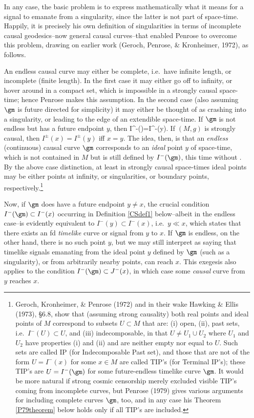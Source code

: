 \documentclass[11pt,a4paper]{article}
\begin{document}
 In any case, the basic problem is to express mathematically what it means for a signal to emanate from a singularity, since the latter is not part of space-time. Happily, it is precisely his own definition of singularities in terms of incomplete causal 
 geodesics--now general causal curves--that enabled Penrose to overcome this problem, drawing on earlier work (Geroch, Penrose, \& Kronheimer, 1972), as follows.  
 
 An endless causal curve may either be complete, i.e.\ have infinite  length, or incomplete (finite length). In the first case it may either go off to infinity, or hover around in a compact set, which  is impossible in a strongly causal space-time; hence Penrose makes this assumption.  In the second case (also assuming $\gm$ is future directed for simplicity) it may either be thought of as  crashing into a singularity, or leading to the edge of an extendible space-time. If $\gm$ is not endless but has a future endpoint $y$, then
 \beq
 I^-(\gm)=I^-(y). \label{IgmIy}
 \eeq
  If $(M,g)$ is strongly causal, then 
$I^{\pm}(x)=I^{\pm}(y)$ iff $x=y$. The idea, then, is that an \emph{endless} (continuous) causal curve $\gm$ corresponds to an \emph{ideal} point 
 $y$ of space-time, which is not contained in $M$ but is still defined by $I^-(\gm)$, this time without .
 By the above case distinction, at least in strongly causal space-times ideal points may be either points at infinity, or singularities, or  boundary points, respectively.\footnote{\label{GKP72}    Geroch, Kronheimer, \&  Penrose (1972) and in their wake Hawking \& Ellis (1973), \S 6.8, show that
 (assuming strong causality) both real points and ideal points of $M$ correspond to subsets  $U\subset M$ that are:
 (i) open, (ii), past sets, i.e.\ $I^-(U)\subset U$, and (iii) indecomposable, in that $U\neq U_1\cup U_2$ where $U_1$ and $U_2$ have properties (i) and (ii) and are neither empty nor equal to $U$. Such sets are called IP (for Indecomposable Past set), and those that are not of the form $U=I^-(x)$ for some $x\in M$ are called TIP's (for Terminal IP's);  these TIP's are $U=I^-(\gm)$ for some  future-endless timelike curve $\gm$. It would  be more natural if strong cosmic censorship merely excluded visible TIP's coming from incomplete curves, but Penrose (1979) gives various arguments for including complete curves $\gm$, too, and in any case his Theorem 
 \ref{P79theorem} below holds only if all TIP's are included.  }
 
\noindent   Now, if $\gm$ does have a future endpoint $y\neq x$, the crucial condition 
$I^-(\gm)\subset I^-(x)$
  occurring in Definition \ref{CSdef1} below--albeit in the endless case--is evidently equivalent to $I^-(y)\subset I^-(x)$, i.e.\ $y\ll x$, which  states that there exists an fd \emph{timelike} curve or signal from $y$ to $x$. If $\gm$ is endless, on the other hand, there is no such point $y$, but we may still interpret  as saying that  timelike signals emanating from the ideal point $y$ defined by $\gm$ (such as a singularity), or from arbitrarily nearby points, can reach $x$.  
  This exegesis also applies to the condition  $I^-(\gm)\subset J^-(x)$, in which case some \emph{causal} curve from $y$  reaches $x$. 
  
\end{document}
